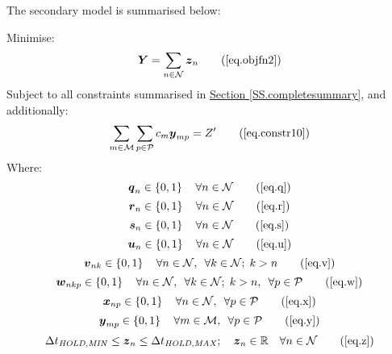 The secondary model is summarised below:

Minimise:
\begin{equation}
    \boldsymbol{Y} = \sum_{n \in \mathcal{N}} \boldsymbol{z}_{n}
    \tag{\ref{eq.objfn2}}
\end{equation}
Subject to all constraints summarised in 
\hyperref[SS.completesummary]{Section \ref*{SS.completesummary}}, and
additionally:
\begin{equation}
    \sum_{m \in \mathcal{M}} \sum_{p \in \mathcal{P}} c_m 
    \boldsymbol{y}_{mp} = Z^{\prime}
    \tag{\ref{eq.constr10}}
\end{equation}
Where:
\begin{equation}
    \boldsymbol{q}_{n} \in \left\{0, 1\right\} \quad \forall n \in \mathcal{N}
    \tag{\ref{eq.q}}
\end{equation}
\begin{equation}
    \boldsymbol{r}_{n} \in \left\{ 0, 1 \right\} \quad \forall n \in
    \mathcal{N}
    \tag{\ref{eq.r}}
\end{equation}
\begin{equation}
    \boldsymbol{s}_{n} \in \left\{ 0, 1 \right\} \quad \forall n \in
    \mathcal{N}
    \tag{\ref{eq.s}}
\end{equation} 
\begin{equation}
    \boldsymbol{u}_{n} \in \left\{ 0, 1 \right\} \quad \forall n \in
    \mathcal{N}
    \tag{\ref{eq.u}}
\end{equation}
\begin{equation}
    \boldsymbol{v}_{nk} \in \left\{ 0, 1 \right\} \quad \forall n \in
    \mathcal{N}, \enspace \forall k \in \mathcal{N}; \; k > n
    \tag{\ref{eq.v}}
\end{equation}
\begin{equation}
    \boldsymbol{w}_{nkp} \in \left\{ 0, 1 \right\} \quad \forall n \in 
    \mathcal{N}, \enspace \forall k \in \mathcal{N}; \; k > n, \enspace \forall
    p \in \mathcal{P}
    \tag{\ref{eq.w}}
\end{equation}
\begin{equation}
    \boldsymbol{x}_{np} \in \left\{ 0, 1 \right\} \quad \forall n \in
    \mathcal{N}, \enspace \forall p \in \mathcal{P}
    \tag{\ref{eq.x}}
\end{equation}
\begin{equation}
    \boldsymbol{y}_{mp} \in \left\{ 0, 1 \right\} \quad \forall m \in
    \mathcal{M}, \enspace \forall p \in \mathcal{P}
    \tag{\ref{eq.y}}
\end{equation}
\begin{equation}
    \Delta t_{\mathit{HOLD,MIN}} \le \boldsymbol{z}_{n} \le 
    \Delta t_{\mathit{HOLD,MAX}}; \quad
    \boldsymbol{z}_{n} \in \mathbb{R} \quad \forall n \in \mathcal{N}
    \tag{\ref{eq.z}}
\end{equation}

